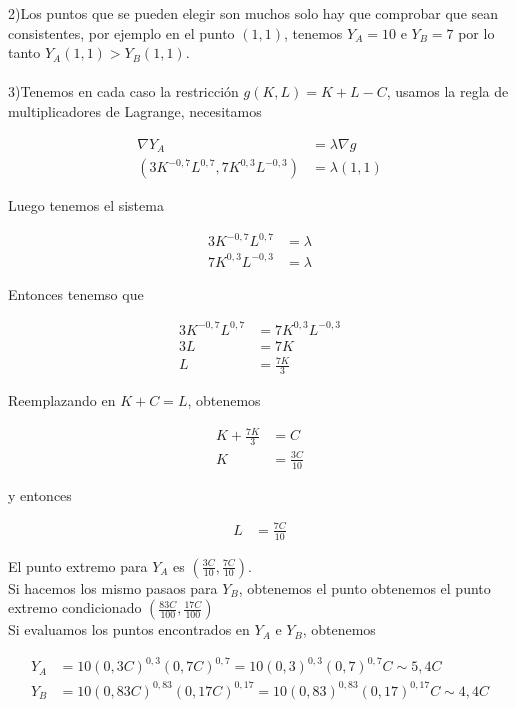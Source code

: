 \documentclass{article}
\theoremstyle{definition}
\begin{document}
2)Los puntos que se pueden elegir son muchos solo hay que comprobar que sean consistentes, por ejemplo en el punto $(1,1)$, tenemos $Y_A=10$ e $Y_B=7$ por lo tanto $Y_A(1,1) > Y_B(1,1)$. \\ \\


3)Tenemos en cada caso la restricción $g(K,L)=K+L-C$, usamos la regla de multiplicadores de Lagrange, necesitamos 

\begin{align*}
    \nabla Y_A &= \lambda \nabla g \\
     (3K^{-0,7}L^{0,7},7K^{0,3}L^{-0,3}) &= \lambda (1,1)
\end{align*}

Luego tenemos el sistema
 
\begin{align*}
    3K^{-0,7}L^{0,7} &= \lambda \\
    7K^{0,3}L^{-0,3} &= \lambda
\end{align*}

Entonces tenemso que


\begin{align*}
    3K^{-0,7}L^{0,7} &= 7K^{0,3}L^{-0,3}\\
    3L &= 7K \\
    L&= \frac{7K}{3}
\end{align*}

Reemplazando en $K+C=L$, obtenemos

\begin{align*}
    K+ \frac{7K}{3} &= C \\
    K &= \frac{3C}{10}
\end{align*}

y entonces 

\begin{align*}
    L&= \frac{7C}{10}
\end{align*}

El punto extremo para $Y_A$ es $\displaystyle \left( \frac{3C}{10}, \frac{7C}{10}\right)$. \\ 

Si hacemos los mismo pasaos para $Y_B$, obtenemos el punto obtenemos el punto extremo condicionado   $\displaystyle \left( \frac{83C}{100}, \frac{17C}{100}\right)$ \\


Si evaluamos los puntos encontrados en $Y_A$ e $Y_B$, obtenemos

\begin{align*}
    Y_A &= 10(0,3C)^{0,3}(0,7C)^{0,7} = 10(0,3)^{0,3}(0,7)^{0,7}C \sim 5,4C \\
    Y_B &= 10(0,83C)^{0,83}(0,17C)^{0,17} = 10(0,83)^{0,83}(0,17)^{0,17}C \sim 4,4C\\
\end{align*}
\end{document}
